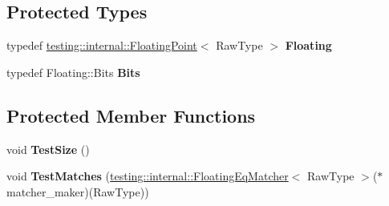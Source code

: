 \subsection*{Protected Types}
\begin{DoxyCompactItemize}
\item 
\mbox{\label{classtesting_1_1gmock__matchers__test_1_1_floating_point_test_ae1459f93e1b18426625daf4fa98e80c6}} 
typedef \mbox{\hyperlink{classtesting_1_1internal_1_1_floating_point}{testing\+::internal\+::\+Floating\+Point}}$<$ Raw\+Type $>$ {\bfseries Floating}
\item 
\mbox{\label{classtesting_1_1gmock__matchers__test_1_1_floating_point_test_addf899bd832ae51103198d201d2f2ea2}} 
typedef Floating\+::\+Bits {\bfseries Bits}
\end{DoxyCompactItemize}
\subsection*{Protected Member Functions}
\begin{DoxyCompactItemize}
\item 
\mbox{\label{classtesting_1_1gmock__matchers__test_1_1_floating_point_test_ad6f8f0f5c939b7447a5717620b728018}} 
void {\bfseries Test\+Size} ()
\item 
\mbox{\label{classtesting_1_1gmock__matchers__test_1_1_floating_point_test_a69d14d66bbd82f6b8bbe985046b59538}} 
void {\bfseries Test\+Matches} (\mbox{\hyperlink{classtesting_1_1internal_1_1_floating_eq_matcher}{testing\+::internal\+::\+Floating\+Eq\+Matcher}}$<$ Raw\+Type $>$($\ast$matcher\+\_\+maker)(Raw\+Type))
\end{DoxyCompactItemize}
